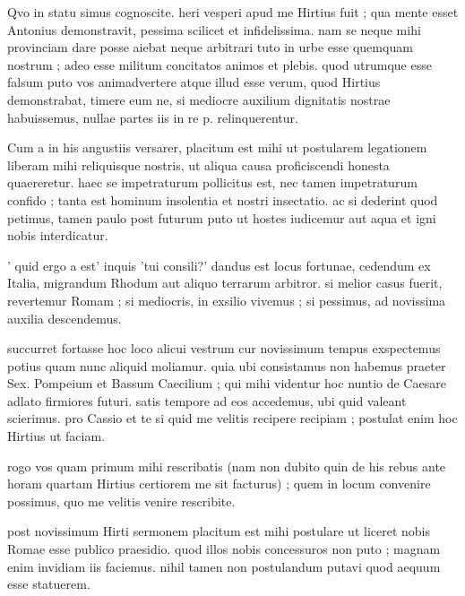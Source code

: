


 Qvo in statu simus cognoscite. heri vesperi apud me Hirtius fuit ; qua mente esset Antonius demonstravit, pessima scilicet et infidelissima. nam se neque mihi provinciam dare posse aiebat neque arbitrari tuto in urbe esse quemquam nostrum ; adeo esse militum concitatos animos et plebis. quod utrumque esse falsum puto vos animadvertere atque illud esse verum, quod Hirtius demonstrabat, timere eum ne, si mediocre auxilium dignitatis nostrae habuissemus, nullae partes iis in re p. relinquerentur.

 Cum a in his angustiis versarer, placitum est mihi ut postularem legationem liberam mihi reliquisque nostris, ut aliqua causa proficiscendi honesta quaereretur. haec se impetraturum pollicitus est, nec tamen impetraturum confido ; tanta est hominum insolentia et nostri insectatio. ac si dederint quod petimus, tamen paulo post futurum puto ut hostes iudicemur aut aqua et igni nobis interdicatur.

 ' quid ergo a est' inquis 'tui consili?' dandus est locus fortunae, cedendum ex Italia, migrandum Rhodum aut aliquo terrarum arbitror. si melior casus fuerit, revertemur Romam ; si mediocris, in exsilio vivemus ; si pessimus, ad novissima auxilia descendemus.

 succurret fortasse hoc loco alicui vestrum cur novissimum tempus exspectemus potius quam nunc aliquid moliamur. quia ubi consistamus non habemus praeter Sex. Pompeium et Bassum Caecilium ; qui mihi videntur hoc nuntio de Caesare adlato firmiores futuri. satis tempore ad eos accedemus, ubi quid valeant scierimus. pro Cassio et te si quid me velitis recipere recipiam ; postulat enim hoc Hirtius ut faciam.

 rogo vos quam primum mihi rescribatis (nam non dubito quin de his rebus ante horam quartam Hirtius certiorem me sit facturus) ; quem in locum convenire possimus, quo me velitis venire rescribite.

 post novissimum Hirti sermonem placitum est mihi postulare ut liceret nobis Romae esse publico praesidio. quod illos nobis concessuros non puto ; magnam enim invidiam iis faciemus. nihil tamen non postulandum putavi quod aequum esse statuerem.
